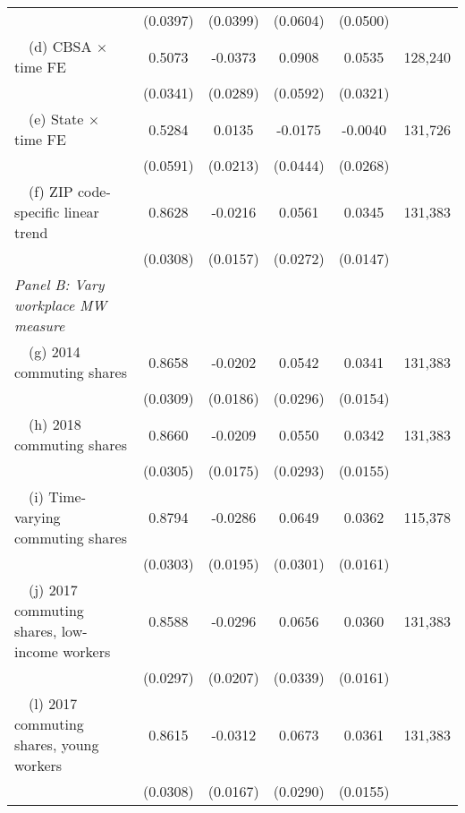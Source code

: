 \begin{landscape}
\begin{table}[ht!]
\begin{tabular}{@{}lccccc@{}}
                                                             & (0.0397) & (0.0399) & (0.0604) & (0.0500) &      \\
        $\quad$(d) CBSA $\times$ time FE                     &  0.5073  &  -0.0373  &  0.0908  &  0.0535  & 128,240 \\
                                                             & (0.0341) & (0.0289) & (0.0592) & (0.0321) &      \\
        $\quad$(e) State $\times$ time FE                    &  0.5284  &  0.0135  &  -0.0175  &  -0.0040  & 131,726 \\
                                                             & (0.0591) & (0.0213) & (0.0444) & (0.0268) &      \\
        $\quad$(f) ZIP code-specific linear trend            &  0.8628  &  -0.0216  &  0.0561  &  0.0345  & 131,383 \\
                                                             & (0.0308) & (0.0157) & (0.0272) & (0.0147) &      \\
        \textit{Panel B: Vary workplace MW measure}          &       &       &       &       &      \\
        $\quad$(g) 2014 commuting shares                     &  0.8658  &  -0.0202  &  0.0542  &  0.0341  & 131,383 \\
                                                             & (0.0309) & (0.0186) & (0.0296) & (0.0154) &      \\
        $\quad$(h) 2018 commuting shares                     &  0.8660  &  -0.0209  &  0.0550  &  0.0342  & 131,383 \\
                                                             & (0.0305) & (0.0175) & (0.0293) & (0.0155) &      \\
        $\quad$(i) Time-varying commuting shares             &  0.8794  &  -0.0286  &  0.0649  &  0.0362  & 115,378 \\
                                                             & (0.0303) & (0.0195) & (0.0301) & (0.0161) &      \\
        $\quad$(j) 2017 commuting shares, low-income workers &  0.8588  &  -0.0296  &  0.0656  &  0.0360  & 131,383 \\
                                                             & (0.0297) & (0.0207) & (0.0339) & (0.0161) &      \\
        $\quad$(l) 2017 commuting shares, young workers      &  0.8615  &  -0.0312  &  0.0673  &  0.0361  & 131,383 \\
                                                             & (0.0308) & (0.0167) & (0.0290) & (0.0155) &      \\ \bottomrule
    \end{tabular}


\end{table}
\end{landscape}
